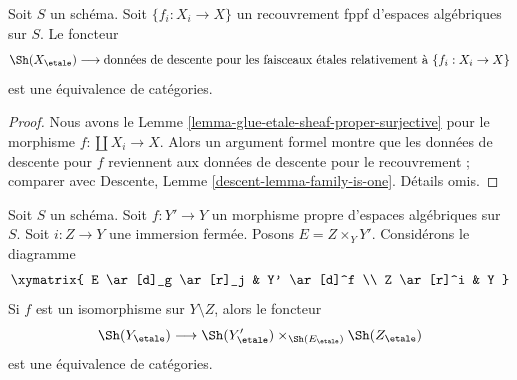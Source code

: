 \begin{lemma}
\label{lemma-glue-etale-sheaf-fppf}
Soit $S$ un schéma.
Soit $\{f_i : X_i \to X\}$ un recouvrement fppf d'espaces algébriques sur $S$.
Le foncteur
$$
\Sh(X_\etale)
\longrightarrow
\text{données de descente pour les faisceaux \'etales relativement à }\{f_i : X_i \to X\}
$$
est une équivalence de catégories.
\end{lemma}

\begin{proof}
Nous avons le Lemme \ref{lemma-glue-etale-sheaf-proper-surjective}
pour le morphisme $f : \coprod X_i \to X$.
Alors un argument formel montre que les données de descente pour $f$
reviennent aux données de descente pour le recouvrement ; comparer
avec Descente, Lemme \ref{descent-lemma-family-is-one}.
Détails omis.
\end{proof}

\begin{lemma}
\label{lemma-glue-etale-sheaf-modification}
Soit $S$ un schéma. Soit $f : Y' \to Y$ un morphisme propre d'espaces algébriques sur $S$. Soit $i : Z \to Y$ une immersion fermée. Posons $E = Z \times_Y Y'$. Considérons le diagramme
$$
\xymatrix{
E \ar[d]_g \ar[r]_j & Y' \ar[d]^f \\
Z \ar[r]^i & Y
}
$$
Si $f$ est un isomorphisme sur $Y \setminus Z$, alors le foncteur $$
\Sh(Y_\etale)
\longrightarrow
\Sh(Y'_\etale) \times_{\Sh(E_\etale)} \Sh(Z_\etale)
$$ est une équivalence de catégories.
\end{lemma}

